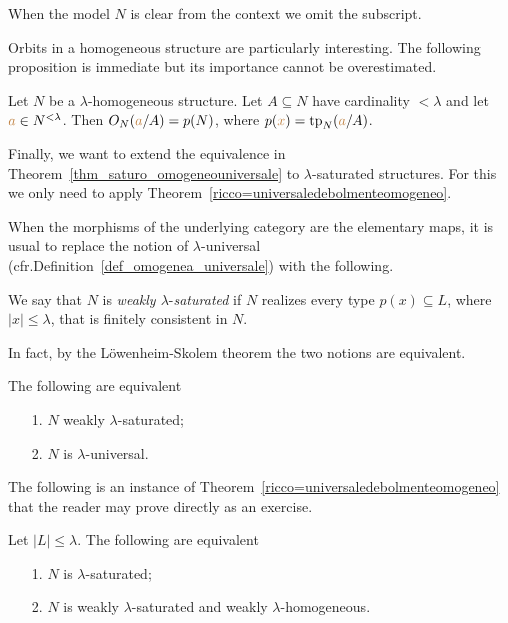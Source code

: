 \documentclass[creche.tex]{subfiles}
\begin{document}

When the model $N$ is clear from the context we omit the subscript.

Orbits in a homogeneous structure are particularly interesting. The following proposition is immediate but its importance cannot be overestimated.

\begin{proposition}\label{omogeneitaorbitetipi}
Let $N$ be a $\lambda\mbox{-}$homogeneous structure. Let $A\subseteq N$ have cardinality $<\lambda$ and let ${\color{brown} a}\in N^{<\lambda}$. Then $O_N({\color{brown} a}/A)=p(N)$, where $p({\color{brown} x})={\rm tp}_N({\color{brown} a}/A)$.\QED
\end{proposition}


Finally, we want to extend the equivalence in Theorem~\ref{thm_saturo_omogeneouniversale} to $\lambda\mbox{-}$saturated structures. For this we only need to apply Theorem~\ref{ricco=universaledebolmenteomogeneo}. 

When the morphisms of the underlying category are the elementary maps, it is usual to replace the notion of $\lambda\mbox{-}$universal (cfr.\@ Definition~\ref{def_omogenea_universale}) with the following.

\begin{definition}\label{def_w_saturation}
  We say that $N$ is \emph{weakly $\lambda\mbox{-}$saturated\/} if $N$ realizes every type $p(x)\subseteq L$, where $|x|\le\lambda$, that is finitely consistent in $N$.\QED
\end{definition}

In fact, by the L\"owenheim-Skolem theorem the two notions are equivalent.

\begin{proposition}\label{prop_w_saturation}
The following are equivalent
\begin{itemize}
\item[1.] $N$ weakly $\lambda\mbox{-}$saturated;
\item[2.] $N$ is $\lambda$-universal.\QED
\end{itemize}
\end{proposition}

The following is an instance of Theorem~\ref{ricco=universaledebolmenteomogeneo} that the reader may prove directly as an exercise.

\begin{corollary}\label{saturo=universaledebolmenteomogeneo}
Let $|L|\le\lambda$. The following are equivalent\nobreak
\begin{itemize}
\item[1.] $N$ is $\lambda\mbox{-}$saturated;
\item[2.] $N$ is weakly $\lambda\mbox{-}$saturated and weakly $\lambda\mbox{-}$homogeneous.\QED
\end{itemize}
\end{corollary}
\end{document}
